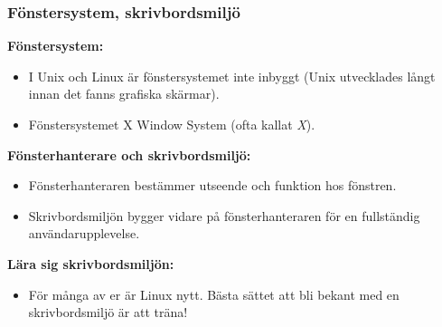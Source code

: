 

\begin{frame}[fragile=singleslide]
    \frametitle{Fönstersystem, skrivbordsmiljö}

    \textbf{Fönstersystem:}
    \begin{itemize}
        \item I Unix och Linux är fönstersystemet inte inbyggt (Unix utvecklades långt innan det fanns grafiska skärmar).
        \item Fönstersystemet X Window System (ofta kallat \emph{X}).
    \end{itemize}

    \textbf{Fönsterhanterare och skrivbordsmiljö:}
    \begin{itemize}
        \item Fönsterhanteraren bestämmer utseende och funktion hos fönstren.
        \item Skrivbordsmiljön bygger vidare på fönsterhanteraren för en fullständig användarupplevelse.
    \end{itemize}

    \textbf{Lära sig skrivbordsmiljön:}
    \begin{itemize}
        \item För många av er är Linux nytt. Bästa sättet att bli bekant med en skrivbordsmiljö är att träna!
    \end{itemize}

\end{frame}
